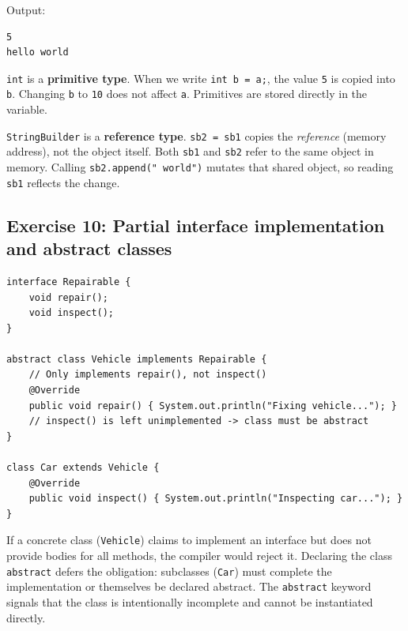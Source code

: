 \documentclass[twoside=false,DIV=14]{scrartcl}
\begin{document}
Output:
\begin{verbatim}
5
hello world
\end{verbatim}

\texttt{int} is a \textbf{primitive type}.  When we write \texttt{int b = a;}, the value \texttt{5} is copied into \texttt{b}.  Changing \texttt{b} to \texttt{10} does not affect \texttt{a}.  Primitives are stored directly in the variable.

\texttt{StringBuilder} is a \textbf{reference type}.  \texttt{sb2 = sb1} copies the \emph{reference} (memory address), not the object itself.  Both \texttt{sb1} and \texttt{sb2} refer to the same object in memory.  Calling \texttt{sb2.append(" world")} mutates that shared object, so reading \texttt{sb1} reflects the change.

\subsection*{Exercise 10: Partial interface implementation and abstract classes}

\begin{lstlisting}
interface Repairable {
    void repair();
    void inspect();
}

abstract class Vehicle implements Repairable {
    // Only implements repair(), not inspect()
    @Override
    public void repair() { System.out.println("Fixing vehicle..."); }
    // inspect() is left unimplemented -> class must be abstract
}

class Car extends Vehicle {
    @Override
    public void inspect() { System.out.println("Inspecting car..."); }
}
\end{lstlisting}

If a concrete class (\texttt{Vehicle}) claims to implement an interface but does not provide bodies for all methods, the compiler would reject it.  Declaring the class \texttt{abstract} defers the obligation: subclasses (\texttt{Car}) must complete the implementation or themselves be declared abstract.  The \texttt{abstract} keyword signals that the class is intentionally incomplete and cannot be instantiated directly.
\end{document}
